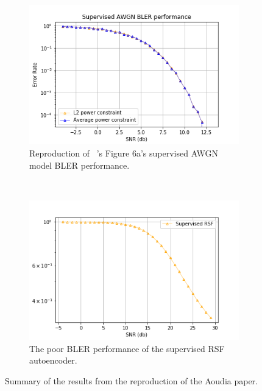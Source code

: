 \documentclass[12pt,onecolumn,letterpaper]{article}
\begin{document}
\begin{figure}[t!]
   \centering
   \begin{subfigure}[t]{0.45\textwidth}
      \centering
      \includegraphics[width=\linewidth]{figures/aoudia_paper/awgn_supervised.png}
      \caption{Reproduction of ~\cite{Aoudia}'s Figure 6a's supervised AWGN model BLER performance.}
      \label{fig:AwgnSupervisedResults}
   \end{subfigure}
 ~
   \begin{subfigure}[t]{0.45\textwidth}
      \centering
      \includegraphics[width=\linewidth]{figures/aoudia_paper/autoencoder_rsf_bler.png}
      \caption{The poor BLER performance of the supervised RSF autoencoder.}
      \label{fig:RsfSupervisedResults}
   \end{subfigure}
   \caption{Summary of the results from the reproduction of the Aoudia paper.}
   \label{fig:AoudiaFinalResults}
\end{figure}
\end{document}
